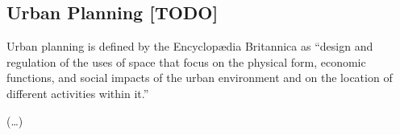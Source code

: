 

\subsection{Urban Planning [TODO]} %
\label{sub:urban_planning}

Urban planning is defined by the Encyclopædia Britannica as ``design and regulation of the uses of space that focus on the physical form, economic functions, and social impacts of the urban environment and on the location of different activities within it.''

(\dots)

